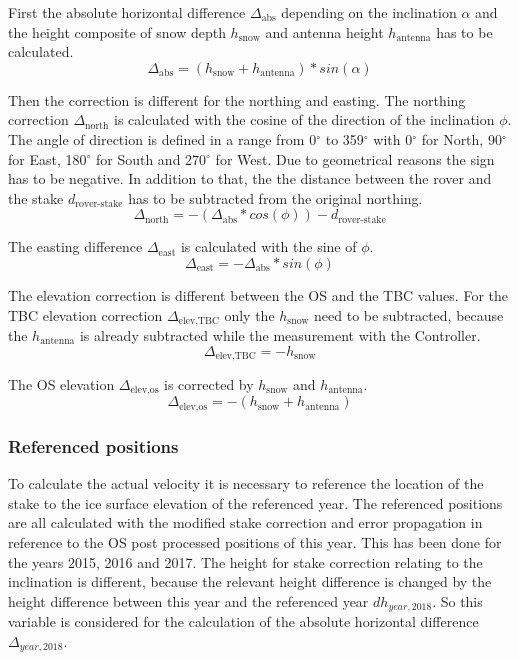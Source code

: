 First the absolute horizontal difference $\Delta_{\text{abs}}$ depending on the inclination $\alpha$ and the height composite of snow depth $h_{\text{snow}}$ and antenna height $h_{\text{antenna}}$ has to be calculated.
\begin{equation}
	\Delta_{\text{abs}} = (h_{\text{snow}} + h_{\text{antenna}}) * sin(\alpha)
\end{equation}

Then the correction is different for the northing and easting. The northing correction $\Delta_{\text{north}}$ is calculated with the cosine of the direction of the inclination $\phi$. 
The angle of direction is defined in a range from 0$^{\circ}$ to 359$^{\circ}$ with 0$^{\circ}$ for North, 90$^{\circ}$ for East, 180$^{\circ}$ for South and 270$^{\circ}$ for West.
Due to geometrical reasons the sign has to be negative. 
In addition to that, the the distance between the rover and the stake $d_{\text{rover-stake}}$ has to be subtracted from the original northing.
\begin{equation}
	\Delta_{\text{north}} = - (\Delta_{\text{abs}} * cos(\phi)) - d_{\text{rover-stake}}
\end{equation}

The easting difference $\Delta_{\text{east}}$ is calculated with the sine of $\phi$.
\begin{equation}
	\Delta_{\text{east}} = - \Delta_{\text{abs}} * sin(\phi)
\end{equation}

The elevation correction is different between the OS and the TBC values.
For the TBC elevation correction $\Delta_{\text{elev,TBC}}$ only the $h_{\text{snow}}$ need to be subtracted, because the $h_{\text{antenna}}$ is already subtracted while the measurement with the Controller.
\begin{equation}
	\Delta_{\text{elev,TBC}} = - h_{\text{snow}} 
\end{equation}

The OS elevation $\Delta_{\text{elev,os}}$ is corrected by $h_{\text{snow}}$ and $h_{\text{antenna}}$.
\begin{equation}
	\Delta_{\text{elev,os}} = - (h_{\text{snow}} + h_{\text{antenna}}) 
\end{equation}

\subsubsection*{Referenced positions}

To calculate the actual velocity it is necessary to reference the location of the stake to the ice surface elevation of the referenced year. 
The referenced positions are all calculated with the modified stake correction and error propagation in reference to the OS post processed positions of this year. 
This has been done for the years 2015, 2016 and 2017.
The height for stake correction relating to the inclination is different, because the relevant height difference is changed by the height difference between this year and the referenced year $dh_{year,2018}$. 
So this variable is considered for the calculation of the absolute horizontal difference $\Delta_{year,2018}$.

